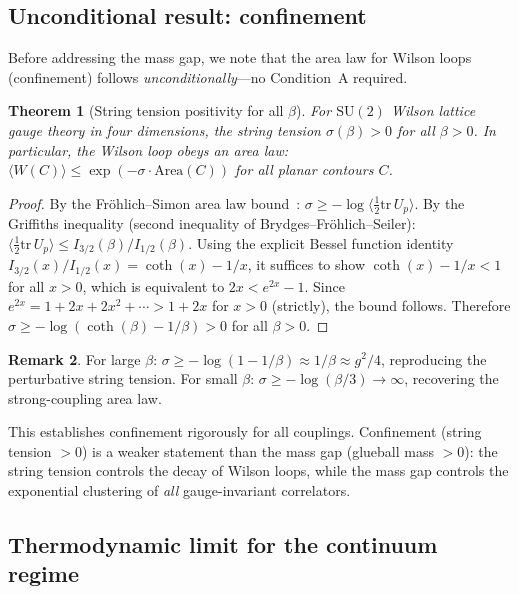 \documentclass[11pt]{article}
\newtheorem{theorem}{Theorem}[section]
\theoremstyle{definition}
\newtheorem{remark}[theorem]{Remark}
\newcommand{\SU}{\mathrm{SU}}
\newcommand{\tr}{\mathrm{tr}}
\begin{document}
\subsection{Unconditional result: confinement}

Before addressing the mass gap, we note that the area law for Wilson
loops (confinement) follows \emph{unconditionally}---no Condition~A
required.

\begin{theorem}[String tension positivity for all $\beta$]
\label{thm:string}
For $\SU(2)$ Wilson lattice gauge theory in four dimensions, the string
tension $\sigma(\beta)>0$ for all $\beta>0$.  In particular, the Wilson
loop obeys an area law: $\langle W(C)\rangle\le\exp(-\sigma\cdot
\mathrm{Area}(C))$ for all planar contours $C$.
\end{theorem}

\begin{proof}
By the Fr\"ohlich--Simon area law bound~\cite{FroehlichSimon}:
$\sigma\ge-\log\langle\frac{1}{2}\tr\,U_p\rangle$.
By the Griffiths inequality (second inequality of Brydges--Fr\"ohlich--Seiler):
$\langle\frac{1}{2}\tr\,U_p\rangle\le I_{3/2}(\beta)/I_{1/2}(\beta)$.
Using the explicit Bessel function identity
$I_{3/2}(x)/I_{1/2}(x)=\coth(x)-1/x$,
it suffices to show $\coth(x)-1/x<1$ for all $x>0$, which is equivalent
to $2x<e^{2x}-1$.  Since $e^{2x}=1+2x+2x^2+\cdots>1+2x$ for $x>0$
(strictly), the bound follows.  Therefore $\sigma\ge-\log(\coth(\beta)
-1/\beta)>0$ for all $\beta>0$.
\end{proof}

\begin{remark}
For large $\beta$: $\sigma\ge-\log(1-1/\beta)\approx 1/\beta\approx
g^2/4$, reproducing the perturbative string tension.  For small $\beta$:
$\sigma\ge-\log(\beta/3)\to\infty$, recovering the strong-coupling area
law.
\end{remark}

This establishes confinement rigorously for all couplings.  Confinement
(string tension $>0$) is a weaker statement than the mass gap (glueball
mass $>0$): the string tension controls the decay of Wilson loops, while
the mass gap controls the exponential clustering of \emph{all}
gauge-invariant correlators.

\subsection{Thermodynamic limit for the continuum regime}
\end{document}
